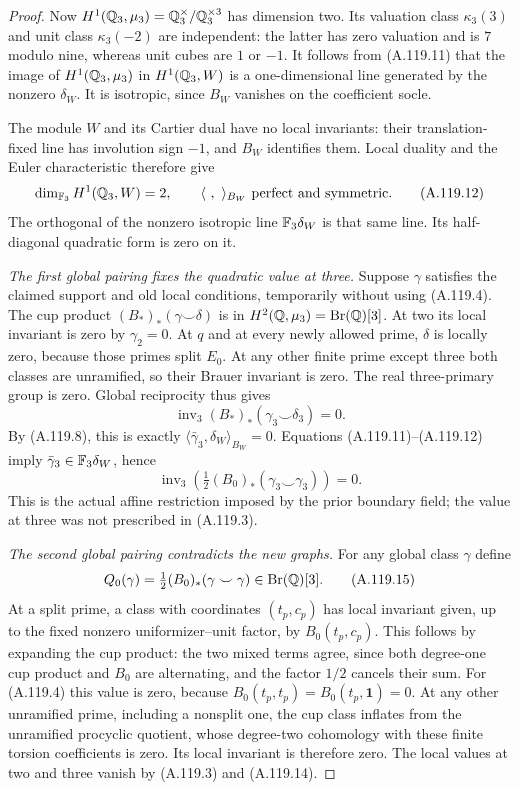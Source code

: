 \begin{proof}
Now \(H^1(\mathbb Q_3,\mu_3)=\mathbb Q_3^\times/\mathbb Q_3^{\times3}\)
has dimension two.  Its valuation class
\(\kappa_3(3)\) and unit class
\(\kappa_3(-2)\) are independent:
the latter has zero valuation and is \(7\) modulo
nine, whereas unit cubes are \(1\) or \(-1\).
It follows from (A.119.11) that the image of
\(H^1(\mathbb Q_3,\mu_3)\) in \(H^1(\mathbb Q_3,W)\) is a
one-dimensional line generated by the nonzero
\(\delta_W\).
It is isotropic, since \(B_W\) vanishes on the
coefficient socle.

The module \(W\) and its Cartier dual have no
local invariants: their translation-fixed line
has involution sign \(-1\), and \(B_W\) identifies
them.
Local duality and the Euler characteristic
\cite[I, Corollary 2.3 and Theorem 2.8]{BIR_MilneADT}
therefore give
\[
 \dim_{\mathbb F_3}H^1(\mathbb Q_3,W)=2,\qquad
 \langle\ ,\ \rangle_{B_W}\ \hbox{perfect and symmetric}.
 \tag{A.119.12}
\]
The orthogonal of the nonzero isotropic line
\(\mathbb F_3\delta_W\) is that same line.
Its half-diagonal quadratic form is zero on it.

\emph{The first global pairing fixes the quadratic value at three.}
Suppose \(\gamma\) satisfies the claimed support
and old local conditions, temporarily without
using (A.119.4).
The cup product
\((B_*)_*(\gamma\smile\delta)\) is in
\(H^2(\mathbb Q,\mu_3)=\operatorname{Br}(\mathbb Q)[3]\).
At two its local invariant is zero by \(\gamma_2=0\).
At \(q\) and at every newly allowed prime,
\(\delta\) is locally zero, because those primes
split \(E_0\).
At any other finite prime except three both
classes are unramified, so their Brauer invariant
is zero.  The real three-primary group is zero.
Global reciprocity thus gives
\[
      \operatorname{inv}_3
          (B_*)_*(\gamma_3\smile\delta_3)=0.
 \tag{A.119.13}
\]
By (A.119.8), this is exactly
\(\langle\bar\gamma_3,\delta_W\rangle_{B_W}=0\).
Equations (A.119.11)--(A.119.12) imply
\(\bar\gamma_3\in\mathbb F_3\delta_W\), hence
\[
 \operatorname{inv}_3\left(
          \tfrac12(B_0)_*(\gamma_3\smile\gamma_3)\right)=0.
 \tag{A.119.14}
\]
This is the actual affine restriction imposed by
the prior boundary field; the value at three
was not prescribed in (A.119.3).

\emph{The second global pairing contradicts the new graphs.}
For any global class \(\gamma\) define
\[
       Q_0(\gamma)=\tfrac12(B_0)_*
                  (\gamma\smile\gamma)\in\operatorname{Br}(\mathbb Q)[3].
 \tag{A.119.15}
\]
At a split prime, a class with coordinates
\((t_p,c_p)\) has local invariant given, up to
the fixed nonzero uniformizer--unit factor, by
\(B_0(t_p,c_p)\).
This follows by expanding the cup product:
the two mixed terms agree, since both degree-one
cup product and \(B_0\) are alternating, and
the factor \(1/2\) cancels their sum.
For (A.119.4) this value is zero, because
\(B_0(t_p,t_p)=B_0(t_p,\mathbf1)=0\).
At any other unramified prime, including a
nonsplit one, the cup class inflates from the
unramified procyclic quotient, whose degree-two
cohomology with these finite torsion coefficients
is zero.  Its local invariant is therefore zero.
The local values at two and three vanish by
(A.119.3) and (A.119.14).


\end{proof}
